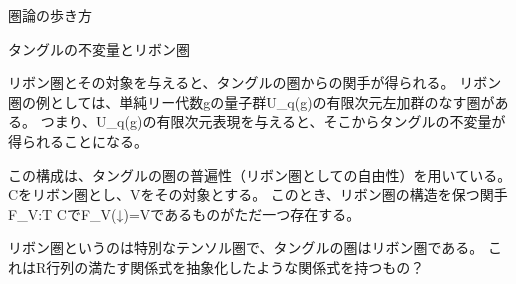 圏論の歩き方

タングルの不変量とリボン圏

リボン圏とその対象を与えると、タングルの圏からの関手が得られる。
リボン圏の例としては、単純リー代数gの量子群U_q(g)の有限次元左加群のなす圏がある。
つまり、U_q(g)の有限次元表現を与えると、そこからタングルの不変量が得られることになる。

この構成は、タングルの圏の普遍性（リボン圏としての自由性）を用いている。
Cをリボン圏とし、Vをその対象とする。
このとき、リボン圏の構造を保つ関手F_V:T \to CでF_V(↓)=Vであるものがただ一つ存在する。

リボン圏というのは特別なテンソル圏で、タングルの圏はリボン圏である。
これはR行列の満たす関係式を抽象化したような関係式を持つもの？

